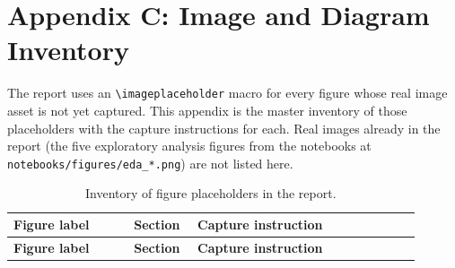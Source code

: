 \chapter*{Appendix C: Image and Diagram Inventory}
\label{appendix:images}

The report uses an \texttt{\textbackslash imageplaceholder} macro for every figure whose real image asset is not yet captured. This appendix is the master inventory of those placeholders with the capture instructions for each. Real images already in the report (the five exploratory analysis figures from the notebooks at \texttt{notebooks/figures/eda\_*.png}) are not listed here.

\begin{longtable}{p{0.27\linewidth} p{0.13\linewidth} p{0.50\linewidth}}
\caption{Inventory of figure placeholders in the report.}\\
\hline
\textbf{Figure label} & \textbf{Section} & \textbf{Capture instruction} \\
\hline
\endfirsthead

\hline
\textbf{Figure label} & \textbf{Section} & \textbf{Capture instruction} \\
\hline
\endhead


\end{longtable}
